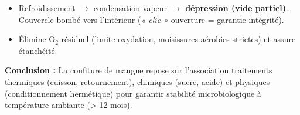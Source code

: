 \documentclass[11pt]{article}
\begin{document}
\begin{exoresolu}
\begin{enumerate}
\begin{itemize}
                \item Refroidissement $\rightarrow$ condensation vapeur $\rightarrow$ \textbf{dépression (vide partiel)}. Couvercle bombé vers l'intérieur (\emph{« clic »} ouverture = garantie intégrité).
                \item Élimine O$_2$ résiduel (limite oxydation, moisissures aérobies strictes) et assure étanchéité.
            \end{itemize}
    \end{enumerate}
    \textbf{Conclusion :} La confiture de mangue repose sur l'association traitements thermiques (cuisson, retournement), chimiques (sucre, acide) et physiques (conditionnement hermétique) pour garantir stabilité microbiologique à température ambiante (> 12 mois).
\end{exoresolu}
\end{document}
